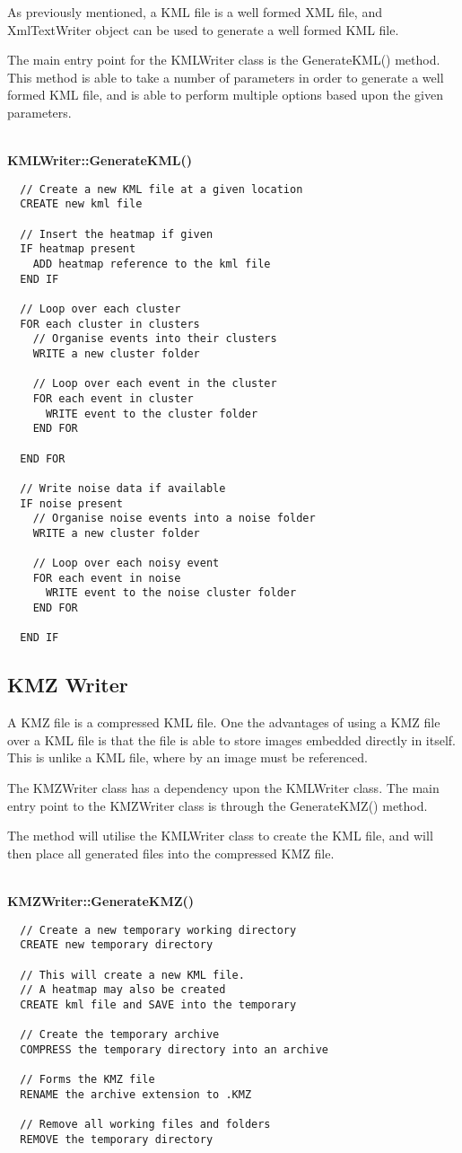 As previously mentioned, a KML file is a well formed XML file, and 
{\ttfamily XmlTextWriter} object can be used to generate a well formed KML 
file.

The main entry point for the KMLWriter class is the {\ttfamily GenerateKML()} 
method. This method is able to take a number of parameters in order to generate
a well formed KML file, and is able to perform multiple options based upon the 
given parameters.

~\\
{\bfseries KMLWriter::GenerateKML()}
\lstset{style=pseudocode}
\begin{lstlisting}
  // Create a new KML file at a given location
  CREATE new kml file

  // Insert the heatmap if given
  IF heatmap present
    ADD heatmap reference to the kml file
  END IF

  // Loop over each cluster
  FOR each cluster in clusters
    // Organise events into their clusters
    WRITE a new cluster folder

    // Loop over each event in the cluster
    FOR each event in cluster
      WRITE event to the cluster folder
    END FOR

  END FOR

  // Write noise data if available
  IF noise present
    // Organise noise events into a noise folder
    WRITE a new cluster folder

    // Loop over each noisy event
    FOR each event in noise
      WRITE event to the noise cluster folder
    END FOR

  END IF
\end{lstlisting}


\subsection{KMZ Writer}
A KMZ file is a compressed KML file. One the advantages of using a KMZ file 
over a KML file is that the file is able to store images embedded directly in
itself. This is unlike a KML file, where by an image must be referenced.

The KMZWriter class has a dependency upon the KMLWriter class. The main entry 
point to the KMZWriter class is through the {\ttfamily GenerateKMZ()} method.

The method will utilise the KMLWriter class to create the KML file, and will 
then place all generated files into the compressed KMZ file.

~\\
{\bfseries KMZWriter::GenerateKMZ()}
\lstset{style=pseudocode}
\begin{lstlisting}
  // Create a new temporary working directory
  CREATE new temporary directory

  // This will create a new KML file.
  // A heatmap may also be created
  CREATE kml file and SAVE into the temporary

  // Create the temporary archive
  COMPRESS the temporary directory into an archive

  // Forms the KMZ file
  RENAME the archive extension to .KMZ

  // Remove all working files and folders
  REMOVE the temporary directory
\end{lstlisting}
